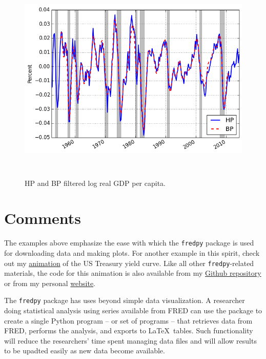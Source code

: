 \documentclass[11pt,fleqn]{article}
\newcommand{\ttt}{\texttt}
\begin{document}
\begin{figure}[h] \caption{\label{fig:3} HP and BP filtered log real GDP per capita.}
\begin{center}
\includegraphics[height = 10cm]{fig_fredpy_example3.png}
\end{center}
\end{figure}


\section{Comments}

The examples above emphasize the ease with which the \ttt{fredpy} package is used for downloading data and making plots. For another example in this spirit, check out my \href{http://youtu.be/34bIQGrndao}{animation} of the US Treasury yield curve. Like all other \ttt{fredpy}-related materials, the code for this animation is also available from my \href{https://github.com/letsgoexploring/fredpy-package}{Github repository} or from my personal \href{http://www.briancjenkins.com/code/fredpy.html}{website}.

The \ttt{fredpy} package has uses beyond simple data visualization. A researcher doing statistical analysis using series available from FRED can use the package to create a single Python program -- or set of programs -- that retrieves data from FRED, performs the analysis, and exports to \LaTeX \ tables. Such functionality will reduce the researchers' time spent managing data files and will allow results to be upadted easily as new data become available.
\end{document}
